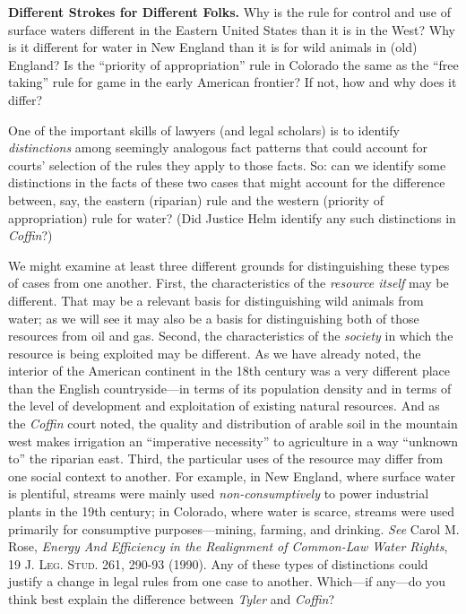 

\item \textbf{Different Strokes for Different Folks.} Why is the rule for
control and use of surface waters different in the Eastern United States than it
is in the West? Why is it different for water in New England than it is for wild
animals in (old) England? Is the ``priority of appropriation'' rule in Colorado
the same as the ``free taking'' rule for game in the early American frontier? If
not, how and why does it differ?

One of the important skills of lawyers (and legal scholars) is to identify
\textit{distinctions} among seemingly analogous fact patterns that could account
for courts' selection of the rules they apply to those facts. So: can we
identify some distinctions in the facts of these two cases that might account
for the difference between, say, the eastern (riparian) rule and the western
(priority of appropriation) rule for water? (Did Justice Helm identify any such
distinctions in \textit{Coffin}?)

We might examine at least three different grounds for distinguishing these types
of cases from one another. First, the characteristics of the \textit{resource
itself} may be different. That may be a relevant basis for distinguishing wild
animals from water; as we will see it may also be a basis for distinguishing
both of those resources from oil and gas. Second, the characteristics of the
\textit{society} in which the resource is being exploited may be different. As
we have already noted, the interior of the American continent in the 18th
century was a very different place than the English countryside---in terms of
its population density and in terms of the level of development and exploitation
of existing natural resources. And as the \textit{Coffin} court noted, the
quality and distribution of arable soil in the mountain west makes irrigation an
``imperative necessity'' to agriculture in a way ``unknown to'' the riparian
east. Third, the particular uses of the resource may differ from one social
context to another. For example, in New England, where surface water is
plentiful, streams were mainly used \textit{non-consumptively} to power
industrial plants in the 19th century; in Colorado, where water is scarce,
streams were used primarily for consumptive purposes---mining, farming, and
drinking. \textit{See} Carol M. Rose, \textit{Energy And Efficiency in the
Realignment of Common-Law Water Rights}, 19 \textsc{J. Leg. Stud.} 261, 290-93
(1990). Any of these types of distinctions could justify a change in legal rules
from one case to another. Which---if any---do you think best explain the
difference between \textit{Tyler} and \textit{Coffin}?



